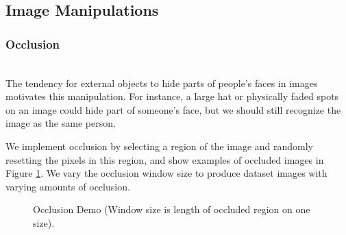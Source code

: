 \documentclass[pageno]{cos429}
\begin{document}
\subsection{Image Manipulations}

\subsubsection{Occlusion}\hspace*{\fill} \\
The tendency for external objects to hide parts of people's faces in images motivates this manipulation. For instance, a large hat or physically faded spots on an image could hide part of someone's face, but we should still recognize the image as the same person.

We implement occlusion by selecting a region of the image and randomly resetting the pixels in this region, and show examples of occluded images in Figure \ref{fig:manipulationdemo_occlusion}. We vary the occlusion window size to produce dataset images with varying amounts of occlusion.

\begin{figure}[!htb]
\caption{Occlusion Demo (Window size is length of occluded region on one size).}
\label{fig:manipulationdemo_occlusion}
\end{figure}
\end{document}
